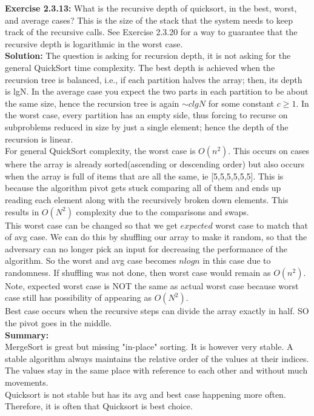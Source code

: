 \documentclass[11pt,fleqn]{article}
\begin{document}
\textbf{Exercise 2.3.13:} What is the recursive depth of quicksort, in the best, worst, and average cases?
This is the size of the stack that the system needs to keep track of the recursive calls. See
Exercise 2.3.20 for a way to guarantee that the recursive depth is logarithmic in the
worst case.\\

\textbf{Solution:} The question is asking for recursion depth, it is not asking for the general QuickSort time complexity. The best depth is achieved when the recursion tree is balanced, i.e., if each partition
halves the array; then, its depth is lgN. In the average case you expect the two parts
in each partition to be about the same size, hence the recursion tree is again $\sim clgN$ for
some constant $c \ge 1$. In the worst case, every partition has an empty side, thus forcing to
recurse on subproblems reduced in size by just a single element; hence the depth of the
recursion is linear.\\

For general QuickSort complexity, the worst case is $O(n^2)$. This occurs on cases where the array is already sorted(ascending or descending order) but also occurs when the array is full of items that are all the same, ie [5,5,5,5,5,5]. This is because the algorithm pivot gets stuck comparing all of them and ends up reading each element along with the recursively broken down elements. This results in $O(N^2)$ complexity due to the comparisons and swaps.\\

This worst case can be changed so that we get $expected$ worst case to match that of avg case. We can do this by shuffling our array to make it random, so that the adversary can no longer pick an input for decreasing the performance of the algorithm. So the worst and avg case becomes $nlogn$ in this case due to randomness. If shuffling was not done, then worst case would remain as $O(n^2)$. Note, expected worst case is NOT the same as actual worst case because worst case still has possibility of appearing as $O(N^2)$.\\

Best case occurs when the recursive steps can divide the array exactly in half. SO the pivot goes in the middle.\\

\textbf{Summary:}\\
MergeSort is great but missing "in-place" sorting. It is however very stable. A stable algorithm always maintains the relative order of the values at their indices. The values stay in the same place with reference to each other and without much movements.\\

Quicksort is not stable but has its avg and best case happening more often. Therefore, it is often that Quicksort is best choice.
\end{document}

